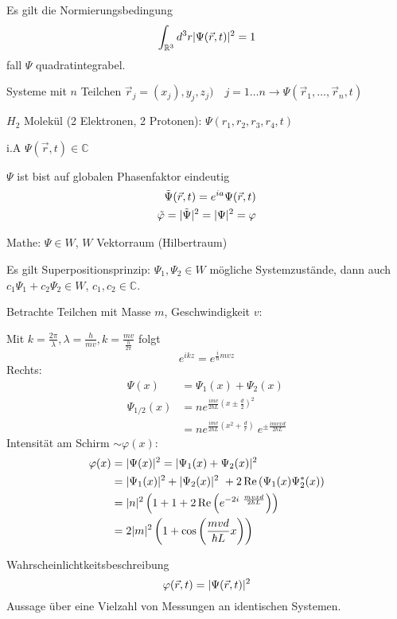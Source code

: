 Es gilt die Normierungsbedingung
\begin{equation*}
    \int_{\mathbb{R}^3} d^3 r \lvert \Psi(\vec{r},t)\rvert^2=1
\end{equation*}
fall $\Psi$ quadratintegrabel.
\begin{bem}
    \item 
    Systeme mit $n$ Teilchen $\vec{r}_j = (x_j),y_j,z_j) \quad j=1 \ldots
    n \rightarrow \Psi(\vec{r}_1, \ldots, \vec{r}_n,t)$

    $H_2$ Molekül (2 Elektronen, 2 Protonen): $\Psi(r_1,r_2,r_3,r_4,t)$ 
    \item
    i.A $\Psi(\vec{r},t) \in \mathbb{C}$
    \item
    $\Psi$ ist bist auf globalen Phasenfaktor eindeutig 
    \begin{align*}
        \tilde{\Psi}(\vec{r},t)=
        e^{ia} \Psi(\vec{r},t) \\
        \tilde{\varphi}=\lvert \tilde{\Psi} \rvert^2 = \lvert \Psi \rvert^2 = \varphi
    \end{align*}
    \item Mathe: $\Psi \in W$, $W$ Vektorraum (Hilbertraum)

    Es gilt Superpositionsprinzip: $\Psi_1, \Psi_2 \in W$ mögliche
    Systemzustände, dann auch $c_1 \Psi_1 + c_2 \Psi_2 \in W$, $c_1,c_2 \in
    \mathbb{C}$. 

    Betrachte Teilchen mit Masse $m$, Geschwindigkeit $v$:

    Mit
    $k=\frac{2\pi}{\lambda},\lambda=\frac{h}{mv},k=\frac{mv}{\frac{h}{2\pi}}$
    folgt
    \begin{equation*}
        e^{ikz} = e^{\frac{i}{\hbar}mvz}
    \end{equation*}
    Rechts:
    \begin{align*}
        \Psi(x) &= \Psi_1(x) + \Psi_2(x) \\
        \Psi_{1/2}(x) &= n e^{\frac{imv}{2\hbar L}\left(x \pm \frac{d}{2}\right)^2} \\
        &= n e^{\frac{imv}{2\hbar L}\left(x^2 + \frac{d}{r}\right)} \
        e^{\pm \frac{imvxd}{2\hbar L}}
    \end{align*}
    Intensität am Schirm $\sim \varphi(x)$:
    \begin{align*}
       \varphi(x) &= \lvert \Psi(x) \rvert^2 = \lvert \Psi_1(x) + \Psi_2(x)\lvert^2 \\
                &= \lvert \Psi_1(x) \rvert^2 + \lvert \Psi_2(x) \rvert^2 \
                    + 2\operatorname{Re} \left( \Psi_1(x) \Psi_2^*(x) \right) \\
                &= \lvert n \rvert^2  \left( 1 + 1 + 2\operatorname{Re} \left( e^{-2i \
                    \frac{mvxd}{2\hbar L}}\right) \right)\\
                &= 2 \lvert m \rvert^2 \left( 1 + \cos \left(\frac{mvd}{\hbar L}x \right) \right)
    \end{align*}
    \item \qme Wahrscheinlichtkeitsbeschreibung
    \begin{equation*}
        \varphi(\vec{r},t) = \lvert \Psi(\vec{r},t)\rvert^2
    \end{equation*}
    Aussage über eine Vielzahl von Messungen an identischen Systemen.


\end{bem}
